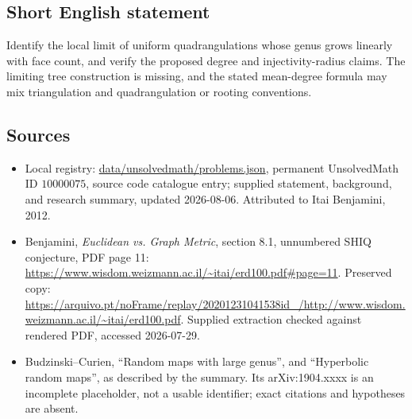\documentclass[11pt]{article}
\begin{document}
\subsection{Short English statement}
Identify the local limit of uniform quadrangulations whose genus grows linearly with face count, and verify the proposed degree and injectivity-radius claims. The limiting tree construction is missing, and the stated mean-degree formula may mix triangulation and quadrangulation or rooting conventions.
\subsection{Sources}
\begin{itemize}
\item Local registry: \url{data/unsolvedmath/problems.json}, permanent UnsolvedMath ID \(10000075\), source code catalogue entry; supplied statement, background, and research summary, updated 2026-08-06. Attributed to Itai Benjamini, 2012.
\item Benjamini, \emph{Euclidean vs. Graph Metric}, section 8.1, unnumbered SHIQ conjecture, PDF page 11: \url{https://www.wisdom.weizmann.ac.il/~itai/erd100.pdf#page=11}. Preserved copy: \url{https://arquivo.pt/noFrame/replay/20201231041538id_/http://www.wisdom.weizmann.ac.il/~itai/erd100.pdf}. Supplied extraction checked against rendered PDF, accessed 2026-07-29.
\item Budzinski--Curien, ``Random maps with large genus'', and ``Hyperbolic random maps'', as described by the summary. Its arXiv:1904.xxxx is an incomplete placeholder, not a usable identifier; exact citations and hypotheses are absent.
\end{itemize}
\end{document}
